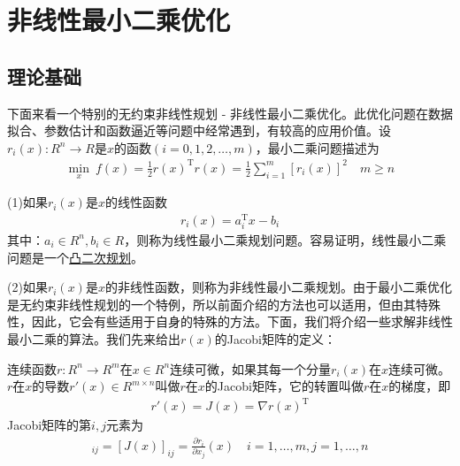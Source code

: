 
\chapter{非线性最小二乘优化}
\section{理论基础}
    \par
    下面来看一个特别的无约束非线性规划 - 非线性最小二乘优化。此优化问题在数据拟合、参数估计和函数逼近等问题中经常遇到，有较高的应用价值。设$r_i(x):R^n \rightarrow R$是$x$的函数$(i=0,1,2,\ldots,m)$，最小二乘问题描述为
    \begin{align*}
     \mathop {\min}\limits_x \ f(x)=\frac 12 r(x)^{\mathrm{T}}r(x)=\frac 12 \mathop {\sum}\limits_{i=1}^m [r_i(x)]^2 \quad m \geqslant n
    \end{align*}
    \par
    (1)如果$r_i(x)$是$x$的线性函数
    \begin{align*}
     r_i(x)=a_i^\mathrm{T} x-b_i
    \end{align*}
    其中：$a_i \in R^n,b_i \in R$，则称为线性最小二乘规划问题。容易证明，线性最小二乘问题是一个\underline{凸二次规划}。
    \par
    (2)如果$r_i(x)$是$x$的非线性函数，则称为非线性最小二乘规划。由于最小二乘优化是无约束非线性规划的一个特例，所以前面介绍的方法也可以适用，但由其特殊性，因此，它会有些适用于自身的特殊的方法。下面，我们将介绍一些求解非线性最小二乘的算法。我们先来给出$r(x)$的Jacobi矩阵的定义：
    \begin{definition}[Jacobi矩阵]
    连续函数$r:R^n \rightarrow R^m$在$x \in R^n$连续可微，如果其每一个分量$r_i(x)$在$x$连续可微。$r$在$x$的导数$r'(x)\in R^{m\times n}$叫做$r$在$x$的Jacobi矩阵，它的转置叫做$r$在$x$的梯度，即
    \begin{align*}
    r'(x)=J(x)=\nabla r(x)^\mathrm{T}
    \end{align*}
    Jacobi矩阵的第$i,j$元素为
    \begin{align*}
    [r'(x)]_{ij} = [J(x)]_{ij} = \frac{\partial r_i}{\partial x_j}(x) \quad i=1,\dots,m,j = 1,\dots,n
    \end{align*}
    \end{definition}

